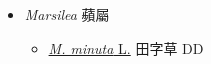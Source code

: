 
  \begin{itemize}
 \item[    ] \textit{Marsilea} 蘋屬
                                
  \begin{itemize}
        \item[] \href{http://www.theplantlist.org/tpl1.1/search?q=Marsilea+minuta}{\textit{M. minuta} L.}   田字草   DD
  \end{itemize}
  \end{itemize}
